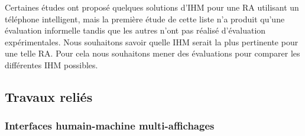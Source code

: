 Certaines études \citep{EnsFinneganIrani2014} \citep{GrubertHeinischQuigleyEtAl2015} \citep{SerranoEnsYangEtAl2015} \citep{SerranoEnsYangEtAl2015b} ont proposé quelques solutions d'IHM pour une RA utilisant un téléphone intelligent, mais la première étude de cette liste n'a produit qu'une évaluation informelle tandis que les autres n'ont pas réalisé d'évaluation expérimentales. Nous souhaitons savoir quelle IHM serait la plus pertinente pour une telle RA. Pour cela nous souhaitons mener des évaluations pour comparer les différentes IHM possibles.


\subsection*{Travaux reliés}
\subsubsection*{Interfaces humain-machine multi-affichages}
